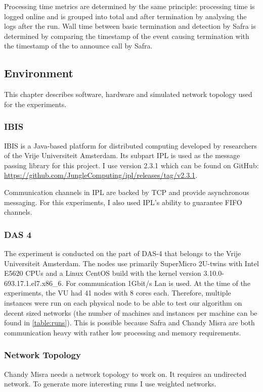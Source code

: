 Processing time metrics are determined by the same principle: processing time is logged online and is grouped into total and after termination by analysing the logs after the run.
Wall time between basic termination and detection by Safra is determined by comparing the timestamp of the event causing termination with the timestamp of the to announce call by Safra.

\subsection{Environment}
This chapter describes software, hardware and simulated network topology used for the experiments.
\subsubsection{IBIS}
IBIS is a Java-based platform for distributed computing developed by researchers of the Vrije Universiteit Amsterdam. 
Its subpart IPL is used as the message passing library for this project. 
I use version 2.3.1 which can be found on GitHub: \href{https://github.com/JungleComputing/ipl/releases/tag/v2.3.1}{https://github.com/JungleComputing/ipl/releases/tag/v2.3.1}.

Communication channels in IPL are backed by TCP and provide asynchronous messaging.
For this experiments, I also used IPL's ability to guarantee FIFO channels.
\subsubsection{DAS 4}
The experiment is conducted on the part of DAS-4 that belongs to the Vrije Universiteit Amsterdam. 
The nodes use primarily SuperMicro 2U-twins with Intel E5620 CPUs and a Linux CentOS build with the kernel version 3.10.0-693.17.1.el7.x86\_6.
For communication 1Gbit/s Lan is used.
At the time of the experiments, the VU had 41 nodes with 8 cores each.
Therefore, multiple instances were run on each physical node to be able to test our algorithm on decent sized networks (the number of machines and instances per machine can be found in \cref{table:runs}).
This is possible because Safra and Chandy Misra are both communication heavy with rather low processing and memory requirements.

\subsubsection{Network Topology}
Chandy Misra needs a network topology to work on. 
It requires an undirected network.
To generate more interesting runs I use weighted networks.

